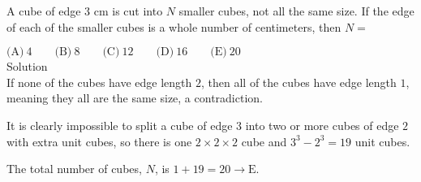 

A cube of edge $3$ cm is cut into $N$ smaller cubes, not all the same size. If the edge of each of the smaller cubes is a whole number of centimeters, then $N=$

$\text{(A)}\ 4 \qquad \text{(B)}\ 8 \qquad \text{(C)}\ 12 \qquad \text{(D)}\ 16 \qquad \text{(E)}\ 20$
\\
Solution
\\
If none of the cubes have edge length $2$, then all of the cubes have edge length $1$, meaning they all are the same size, a contradiction.

It is clearly impossible to split a cube of edge $3$ into two or more cubes of edge $2$ with extra unit cubes, so there is one $2\times 2\times 2$ cube and $3^3-2^3=19$ unit cubes.

The total number of cubes, $N$, is $1+19=20\rightarrow \boxed{\text{E}}$.
